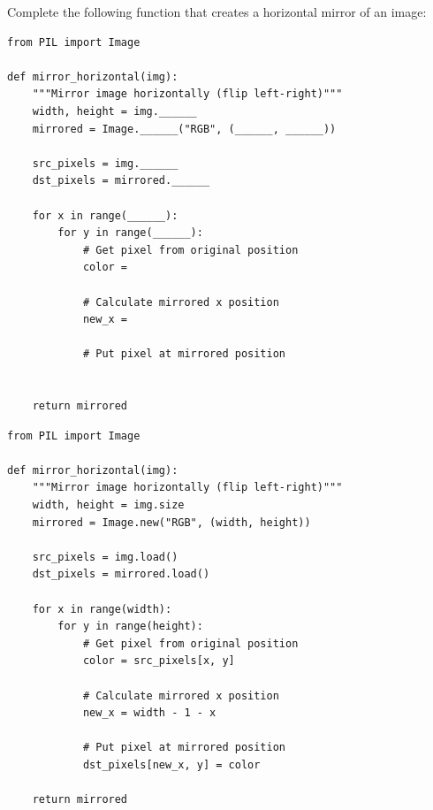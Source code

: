 \documentclass{csexam}
\begin{document}
\begin{questions}

\newpage

\question[15] Complete the following function that creates a horizontal mirror of an image:

\begin{lstlisting}
from PIL import Image

def mirror_horizontal(img):
    """Mirror image horizontally (flip left-right)"""
    width, height = img.______
    mirrored = Image.______("RGB", (______, ______))

    src_pixels = img.______
    dst_pixels = mirrored.______

    for x in range(______):
        for y in range(______):
            # Get pixel from original position
            color =

            # Calculate mirrored x position
            new_x =

            # Put pixel at mirrored position


    return mirrored
\end{lstlisting}

\vspace{2cm}

\begin{solution}
\begin{lstlisting}
from PIL import Image

def mirror_horizontal(img):
    """Mirror image horizontally (flip left-right)"""
    width, height = img.size
    mirrored = Image.new("RGB", (width, height))

    src_pixels = img.load()
    dst_pixels = mirrored.load()

    for x in range(width):
        for y in range(height):
            # Get pixel from original position
            color = src_pixels[x, y]

            # Calculate mirrored x position
            new_x = width - 1 - x

            # Put pixel at mirrored position
            dst_pixels[new_x, y] = color

    return mirrored
\end{lstlisting}
\end{solution}

\newpage

\end{questions}
\end{document}
